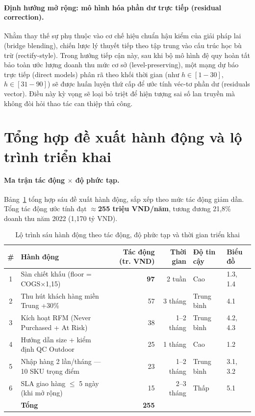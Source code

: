 \documentclass{article}
\begin{document}
\paragraph{Định hướng mở rộng: mô hình hóa phần dư trực tiếp (residual correction).} 
Nhằm thay thế sự phụ thuộc vào cơ chế hiệu chuẩn hậu kiểm của giải pháp lai (bridge blending), chiến lược lý thuyết tiếp theo tập trung vào cấu trúc học bù trừ (rectify-style). Trong hướng tiếp cận này, sau khi bộ mô hình đệ quy hoàn tất bảo toàn ước lượng doanh thu mức cơ sở (level-preserving), một mạng dự báo trực tiếp (direct models) phân rã theo khối thời gian (như $h \in [1-30]$, $h \in [31-90]$) sẽ được huấn luyện thứ cấp để ước tính véc-tơ phần dư (residuals vector). Điều này kỳ vọng sẽ loại bỏ triệt để hiện tượng sai số lan truyền mà không đòi hỏi thao tác can thiệp thủ công.

\section{Tổng hợp đề xuất hành động và lộ trình triển khai}
\label{sec:recommendations}

\paragraph{Ma trận tác động $\times$ độ phức tạp.}
Bảng~\ref{tab:actions} tổng hợp sáu đề xuất hành động, sắp xếp theo mức tác động giảm dần. Tổng tác động ước tính đạt \textbf{$\approx$255 triệu VND/năm}, tương đương 21,8\% doanh thu năm 2022 (1,170 tỷ VND).

\begin{table}[H]
\caption{Lộ trình sáu hành động theo tác động, độ phức tạp và thời gian triển khai}
\label{tab:actions}
\centering
\small
\begin{tabular}{@{}clrrll@{}}
\toprule
\# & Hành động & Tác động (tr. VND) & Thời gian & Độ tin cậy & Biểu đồ \\
\midrule
1 & Sàn chiết khấu (floor = COGS$\times$1,15) & \textbf{97} & 2 tuần & Cao & 1.3, 1.4 \\
2 & Thu hút khách hàng miền Trung +30\% & 57 & 3 tháng & Trung bình & 4.1 \\
3 & Kích hoạt RFM (Never Purchased + At Risk) & 38 & 1--2 tháng & Trung bình & 4.2, 4.3 \\
4 & Hướng dẫn size + kiểm định QC Outdoor & 25 & 1 tháng & Cao & 1.2 \\
5 & Nhập hàng 2 lần/tháng --- 10 SKU trọng điểm & 23 & 1--2 tháng & Trung bình & 3.1, 3.2 \\
6 & SLA giao hàng $\leq$ 5 ngày (khi mở rộng) & 15 & 2--3 tháng & Thấp & 5.1 \\
\midrule
& \textbf{Tổng} & \textbf{255} & & & \\
\bottomrule
\end{tabular}
\end{table}
\end{document}
